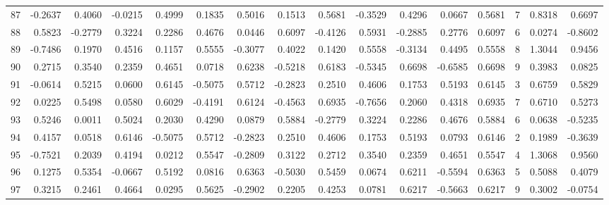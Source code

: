 \begin{tabular}{lrrrrrrrrrrrrrrr}
87  &     -0.2637 &  0.4060 & -0.0215 &  0.4999 &  0.1835 &  0.5016 &  0.1513 &  0.5681 & -0.3529 &  0.4296 &   0.0667 &     0.5681 &      7 &                    0.8318 &                     0.6697 \\
88  &      0.5823 & -0.2779 &  0.3224 &  0.2286 &  0.4676 &  0.0446 &  0.6097 & -0.4126 &  0.5931 & -0.2885 &   0.2776 &     0.6097 &      6 &                    0.0274 &                    -0.8602 \\
89  &     -0.7486 &  0.1970 &  0.4516 &  0.1157 &  0.5555 & -0.3077 &  0.4022 &  0.1420 &  0.5558 & -0.3134 &   0.4495 &     0.5558 &      8 &                    1.3044 &                     0.9456 \\
90  &      0.2715 &  0.3540 &  0.2359 &  0.4651 &  0.0718 &  0.6238 & -0.5218 &  0.6183 & -0.5345 &  0.6698 &  -0.6585 &     0.6698 &      9 &                    0.3983 &                     0.0825 \\
91  &     -0.0614 &  0.5215 &  0.0600 &  0.6145 & -0.5075 &  0.5712 & -0.2823 &  0.2510 &  0.4606 &  0.1753 &   0.5193 &     0.6145 &      3 &                    0.6759 &                     0.5829 \\
92  &      0.0225 &  0.5498 &  0.0580 &  0.6029 & -0.4191 &  0.6124 & -0.4563 &  0.6935 & -0.7656 &  0.2060 &   0.4318 &     0.6935 &      7 &                    0.6710 &                     0.5273 \\
93  &      0.5246 &  0.0011 &  0.5024 &  0.2030 &  0.4290 &  0.0879 &  0.5884 & -0.2779 &  0.3224 &  0.2286 &   0.4676 &     0.5884 &      6 &                    0.0638 &                    -0.5235 \\
94  &      0.4157 &  0.0518 &  0.6146 & -0.5075 &  0.5712 & -0.2823 &  0.2510 &  0.4606 &  0.1753 &  0.5193 &   0.0793 &     0.6146 &      2 &                    0.1989 &                    -0.3639 \\
95  &     -0.7521 &  0.2039 &  0.4194 &  0.0212 &  0.5547 & -0.2809 &  0.3122 &  0.2712 &  0.3540 &  0.2359 &   0.4651 &     0.5547 &      4 &                    1.3068 &                     0.9560 \\
96  &      0.1275 &  0.5354 & -0.0667 &  0.5192 &  0.0816 &  0.6363 & -0.5030 &  0.5459 &  0.0674 &  0.6211 &  -0.5594 &     0.6363 &      5 &                    0.5088 &                     0.4079 \\
97  &      0.3215 &  0.2461 &  0.4664 &  0.0295 &  0.5625 & -0.2902 &  0.2205 &  0.4253 &  0.0781 &  0.6217 &  -0.5663 &     0.6217 &      9 &                    0.3002 &                    -0.0754 \\

\end{tabular}

